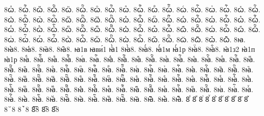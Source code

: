 {8ꙍⷧ.
8ꙍⷧ҇.
8ꙍⷨ.
8ꙍⷨ҇.
8ꙍⷩ.
8ꙍⷩ҇.
8ꙍⷪ.
8ꙍⷪ҇.
8ꙍⷫ.
8ꙍⷫ҇.
8ꙍⷬ.
8ꙍⷬ҇.
8ꙍⷭ.
8ꙍⷭ҇.
8ꙍⷮ.
8ꙍⷮ҇.
8ꙍⷯ.
8ꙍⷯ҇.
8ꙍⷰ.
8ꙍⷰ҇.
8ꙍⷱ.
8ꙍⷱ҇.
8ꙍⷲ.
8ꙍⷲ҇.
8ꙍⷳ.
8ꙍⷳ҇.
8ꙍⷴ.
8ꙍⷴ҇.
8ꙍⷵ.
8ꙍⷵ҇.
8ꙍⷶ.
8ꙍⷶ҇.
8ꙍⷷ.
8ꙍⷷ҇.
8ꙍⷸ.
8ꙍⷸ҇.
8ꙍⷹ.
8ꙍⷹ҇.
8ꙍⷺ.
8ꙍⷺ҇.
8ꙍⷻ.
8ꙍⷻ҇.
8ꙍⷼ.
8ꙍⷼ҇.
8ꙍⷽ.
8ꙍⷽ҇.
8ꙍⷾ.
8ꙍⷾ҇.
8ꙍⷿ.
8ꙍⷿ҇.
8ꙍꙴ.
8ꙍꙴ҇.
8ꙍꙵ.
8ꙍꙵ҇.
8ꙍꙶ.
8ꙍꙶ҇.
8ꙍꙷ.
8ꙍꙷ҇.
8ꙍꙸ.
8ꙍꙸ҇.
8ꙍꙹ.
8ꙍꙹ҇.
8ꙍꙺ.
8ꙍꙺ҇.
8ꙍꙻ.
8ꙍꙻ҇.
8ꙍ꙼.
8ꙍ꙼҇.
8ꙍ꙽.
8ꙍ꙽҇.
8ꙗ.
8ꙗ̀8.
8ꙗ́8.
8ꙗ̈8.
8ꙗ̑8.
ꙗ1в
ꙗви́1
ꙗ҆̀1
8ꙗ҆̀8.
8ꙗ҆́8.
ꙗ҆́1м
ꙗ҆́1р
8ꙗ҆̈8.
8ꙗ҆̑8.
ꙗ҆1з2
ꙗ҆1п
ꙗ҆1р
8ꙗⷠ.
8ꙗⷠ҇.
8ꙗⷡ.
8ꙗⷡ҇.
8ꙗⷢ.
8ꙗⷢ҇.
8ꙗⷣ.
8ꙗⷣ҇.
8ꙗⷤ.
8ꙗⷤ҇.
8ꙗⷥ.
8ꙗⷥ҇.
8ꙗⷦ.
8ꙗⷦ҇.
8ꙗⷧ.
8ꙗⷧ҇.
8ꙗⷨ.
8ꙗⷨ҇.
8ꙗⷩ.
8ꙗⷩ҇.
8ꙗⷪ.
8ꙗⷪ҇.
8ꙗⷫ.
8ꙗⷫ҇.
8ꙗⷬ.
8ꙗⷬ҇.
8ꙗⷭ.
8ꙗⷭ҇.
8ꙗⷮ.
8ꙗⷮ҇.
8ꙗⷯ.
8ꙗⷯ҇.
8ꙗⷰ.
8ꙗⷰ҇.
8ꙗⷱ.
8ꙗⷱ҇.
8ꙗⷲ.
8ꙗⷲ҇.
8ꙗⷳ.
8ꙗⷳ҇.
8ꙗⷴ.
8ꙗⷴ҇.
8ꙗⷵ.
8ꙗⷵ҇.
8ꙗⷶ.
8ꙗⷶ҇.
8ꙗⷷ.
8ꙗⷷ҇.
8ꙗⷸ.
8ꙗⷸ҇.
8ꙗⷹ.
8ꙗⷹ҇.
8ꙗⷺ.
8ꙗⷺ҇.
8ꙗⷻ.
8ꙗⷻ҇.
8ꙗⷼ.
8ꙗⷼ҇.
8ꙗⷽ.
8ꙗⷽ҇.
8ꙗⷾ.
8ꙗⷾ҇.
8ꙗⷿ.
8ꙗⷿ҇.
8ꙗꙴ.
8ꙗꙴ҇.
8ꙗꙵ.
8ꙗꙵ҇.
8ꙗꙶ.
8ꙗꙶ҇.
8ꙗꙷ.
8ꙗꙷ҇.
8ꙗꙸ.
8ꙗꙸ҇.
8ꙗꙹ.
8ꙗꙹ҇.
8ꙗꙺ.
8ꙗꙺ҇.
8ꙗꙻ.
8ꙗꙻ҇.
8ꙗ꙼.
8ꙗ꙼҇.
8ꙗ꙽.
8ꙗ꙽҇.
8ꙴ
8ꙵ
8ꙶ
8ꙷ
8ꙸ
8ꙹ
8ꙺ
8ꙻ
8꙼
8꙽
8꙾8
8ꙿ8
8︦8
8︮8
8︯8
}
